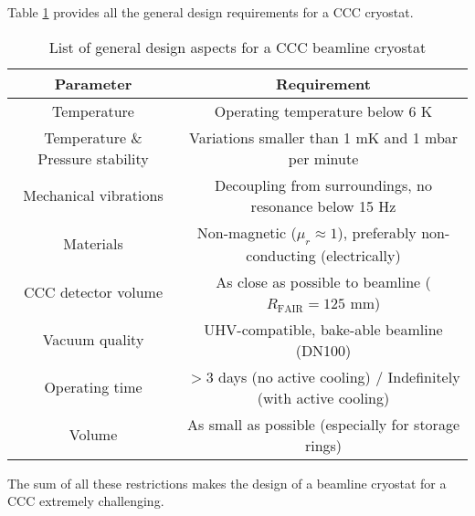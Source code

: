 \documentclass[12pt,a4paper]{report}
\begin{document}
       	Table \ref{CH4_tab_cryostat} provides all the general design requirements for a CCC cryostat.
       	
       	\begin{table}[h!]
       		\centering
       		\begin{tabular}{c|c}
       			\hline
       			\textbf{Parameter} & \textbf{Requirement} \\ \hline
       			Temperature & Operating temperature below 6 K \\ \hline
       			Temperature \& Pressure stability & Variations smaller than 1 mK and 1 mbar per minute \\ \hline
       			Mechanical vibrations & Decoupling from surroundings, no resonance below 15 Hz \\ \hline
       			Materials & Non-magnetic ($\mu_r \approx 1$), preferably non-conducting (electrically) \\ \hline
       			CCC detector volume & As close as possible to beamline ($R_{\text{FAIR}} = 125$ mm) \\ \hline
       			Vacuum quality & UHV-compatible, bake-able beamline (DN100) \\ \hline
       			Operating time & $>3$ days (no active cooling) / Indefinitely (with active cooling) \\ \hline
       			Volume & As small as possible (especially for storage rings) \\ \hline
       		\end{tabular}
       		\caption{\small{List of general design aspects for a CCC beamline cryostat}}
       		\label{CH4_tab_cryostat}
       	\end{table}
       	
       	The sum of all these restrictions makes the design of a beamline cryostat for a CCC extremely challenging.
\end{document}
